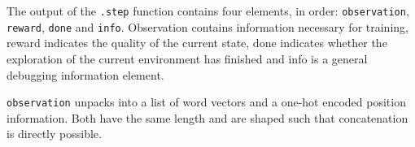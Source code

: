 \documentclass[a4paper, justified]{tufte-handout}
\begin{document}
The output of the \texttt{.step} function contains four elements, in order: \texttt{observation}, \texttt{reward}, \texttt{done} and \texttt{info}. Observation contains information necessary for training, reward indicates the quality of the current state, done indicates whether the exploration of the current environment has finished and info is a general debugging information element.

\texttt{observation} unpacks into a list of word vectors and a one-hot encoded position information. Both have the same length and are shaped such that concatenation is directly possible. 





\end{document}
